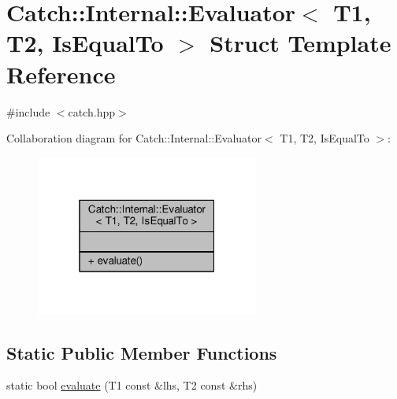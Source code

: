 \hypertarget{struct_catch_1_1_internal_1_1_evaluator_3_01_t1_00_01_t2_00_01_is_equal_to_01_4}{\section{Catch\-:\-:Internal\-:\-:Evaluator$<$ T1, T2, Is\-Equal\-To $>$ Struct Template Reference}
\label{struct_catch_1_1_internal_1_1_evaluator_3_01_t1_00_01_t2_00_01_is_equal_to_01_4}
}


{\ttfamily \#include $<$catch.\-hpp$>$}



Collaboration diagram for Catch\-:\-:Internal\-:\-:Evaluator$<$ T1, T2, Is\-Equal\-To $>$\-:
\nopagebreak
\begin{figure}[H]
\begin{center}
\leavevmode
\includegraphics[width=208pt]{struct_catch_1_1_internal_1_1_evaluator_3_01_t1_00_01_t2_00_01_is_equal_to_01_4__coll__graph}
\end{center}
\end{figure}
\subsection*{Static Public Member Functions}
\begin{DoxyCompactItemize}
\item 
static bool \hyperlink{struct_catch_1_1_internal_1_1_evaluator_3_01_t1_00_01_t2_00_01_is_equal_to_01_4_a166b2b7849247397e63fb2940481b217}{evaluate} (T1 const \&lhs, T2 const \&rhs)
\end{DoxyCompactItemize}


